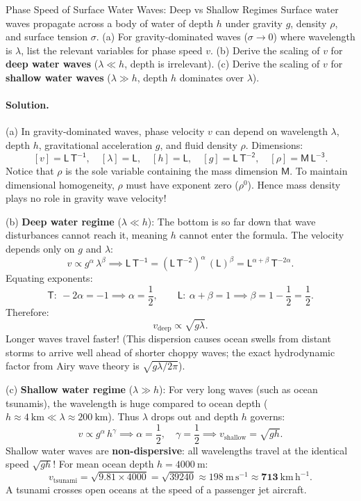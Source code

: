 \begin{workedexample}{Phase Speed of Surface Water Waves: Deep vs Shallow Regimes}
Surface water waves propagate across a body of water of depth $h$ under gravity $g$, density $\rho$, and surface tension $\sigma$.
(a) For gravity-dominated waves ($\sigma \to 0$) where wavelength is $\lambda$, list the relevant variables for phase speed $v$.
(b) Derive the scaling of $v$ for \textbf{deep water waves} ($\lambda \ll h$, depth is irrelevant).
(c) Derive the scaling of $v$ for \textbf{shallow water waves} ($\lambda \gg h$, depth $h$ dominates over $\lambda$).

\paragraph{Solution.}

(a) In gravity-dominated waves, phase velocity $v$ can depend on wavelength $\lambda$, depth $h$, gravitational acceleration $g$, and fluid density $\rho$.
Dimensions:
\[
[v] = \mathsf{L\,T^{-1}}, \quad [\lambda] = \mathsf{L}, \quad [h] = \mathsf{L}, \quad [g] = \mathsf{L\,T^{-2}}, \quad [\rho] = \mathsf{M\,L^{-3}}.
\]
Notice that $\rho$ is the sole variable containing the mass dimension $\mathsf{M}$. To maintain dimensional homogeneity, $\rho$ must have exponent zero ($\rho^0$). Hence mass density plays no role in gravity wave velocity!

(b) \textbf{Deep water regime} ($\lambda \ll h$): The bottom is so far down that wave disturbances cannot reach it, meaning $h$ cannot enter the formula. The velocity depends only on $g$ and $\lambda$:
\[
v \propto g^\alpha\,\lambda^\beta \implies \mathsf{L\,T^{-1}} = (\mathsf{L\,T^{-2}})^\alpha\,(\mathsf{L})^\beta = \mathsf{L}^{\alpha + \beta}\,\mathsf{T}^{-2\alpha}.
\]
Equating exponents:
\[
\mathsf{T}:\ -2\alpha = -1 \implies \alpha = \frac{1}{2}, \qquad \mathsf{L}:\ \alpha + \beta = 1 \implies \beta = 1 - \frac{1}{2} = \frac{1}{2}.
\]
Therefore:
\[
\boxed{v_{\text{deep}} \propto \sqrt{g\lambda}.}
\]
Longer waves travel faster! (This dispersion causes ocean swells from distant storms to arrive well ahead of shorter choppy waves; the exact hydrodynamic factor from Airy wave theory is $\sqrt{g\lambda/2\pi}$).

(c) \textbf{Shallow water regime} ($\lambda \gg h$): For very long waves (such as ocean tsunamis), the wavelength is huge compared to ocean depth ($h \approx 4\ \mathrm{km} \ll \lambda \approx 200\ \mathrm{km}$). Thus $\lambda$ drops out and depth $h$ governs:
\[
v \propto g^\alpha\,h^\gamma \implies \alpha = \frac{1}{2},\quad \gamma = \frac{1}{2} \implies \boxed{v_{\text{shallow}} = \sqrt{gh}.}
\]
Shallow water waves are \textbf{non-dispersive}: all wavelengths travel at the identical speed $\sqrt{gh}$! For mean ocean depth $h = 4000\ \mathrm{m}$:
\[
v_{\text{tsunami}} = \sqrt{9.81\times 4000} = \sqrt{39240} \approx 198\ \mathrm{m\,s^{-1}} \approx \mathbf{713\ \mathrm{km\,h^{-1}}.}
\]
A tsunami crosses open oceans at the speed of a passenger jet aircraft.
\end{workedexample}

